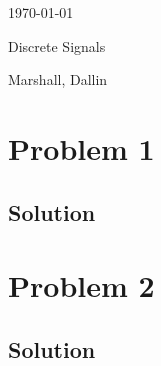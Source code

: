 \documentclass[11pt]{article}
\newcommand\textbox[1]{%
  \parbox{.333\textwidth}{#1}%
}
\begin{document}
\noindent\textbox{ \Large \today \hfill}\textbox{\hfil \Large Discrete Signals ~~~~~~~~~~~ \hfil}\textbox{\hfill \Large  Marshall, Dallin}

\section*{Problem 1}

\subsection*{Solution}


\section*{Problem 2}

\subsection*{Solution}
\end{document}
